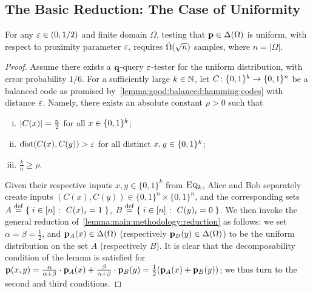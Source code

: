 \subsection{The Basic Reduction: The Case of Uniformity}\label{sec:uniformity:communication}
\begin{theorem}
\label{theo:uniformity:lb}
For any $\eps\in(0,1/2)$ and finite domain $\Omega$, testing that $\p\in \distribs{\Omega}$ is uniform, with respect to proximity parameter $\eps$, requires $\tildeOmega{\sqrt{n}}$ samples, where $n = |\Omega|$.
\end{theorem}
\begin{proof}
Assume there exists a $\q$-query $\eps$-tester for the uniform distribution, with error probability $1/6$. For a sufficiently large $k\in\N$, let $C\colon \bitset^k \to \bitset^n$ be a balanced code as promised by~\cref{lemma:good:balanced:hamming:codes} with distance $\eps$. Namely, there exists an absolute constant $\rho > 0$ such that
\begin{enumerate}[(i)]
  \item $\abs{C(x)} = \frac{n}{2}$ for all $x\in \bitset^k$;
  \item $\dist{C(x)}{C(y)} > \eps$ for all distinct $x,y\in \bitset^k$;
  \item $\frac{k}{n} \geq \rho$.
\end{enumerate}
Given their respective inputs $x,y\in\{0,1\}^k$ from $\EQ[k]$, Alice and Bob separately create inputs $(C(x),C(y))\in\{0,1\}^n\times\{0,1\}^n$, and the corresponding sets $A\eqdef \setOfSuchThat{ i\in[n] }{ C(x)_i=1 }$, $B\eqdef \setOfSuchThat{ i\in[n] }{ C(y)_i =0 }$. We then invoke the general reduction of~\cref{lemma:main:methodology:reduction} as follows: we set $\alpha=\beta=\frac{1}{2}$, and $\p_A(x)\in\distribs{\domain}$ (respectively $\p_B(y)\in\distribs{\domain}$) to be the uniform distribution on the set $A$ (respectively $B$). It is clear that the decomposability condition of the lemma is satisfied for $\p(x,y) = \frac{\alpha}{\alpha+\beta} \cdot \p_A(x)+\frac{\beta}{\alpha+\beta} \cdot \p_B(y) = \frac{1}{2}(\p_A(x)+\p_B(y))$; we thus turn to the second and third conditions.


\end{proof}
